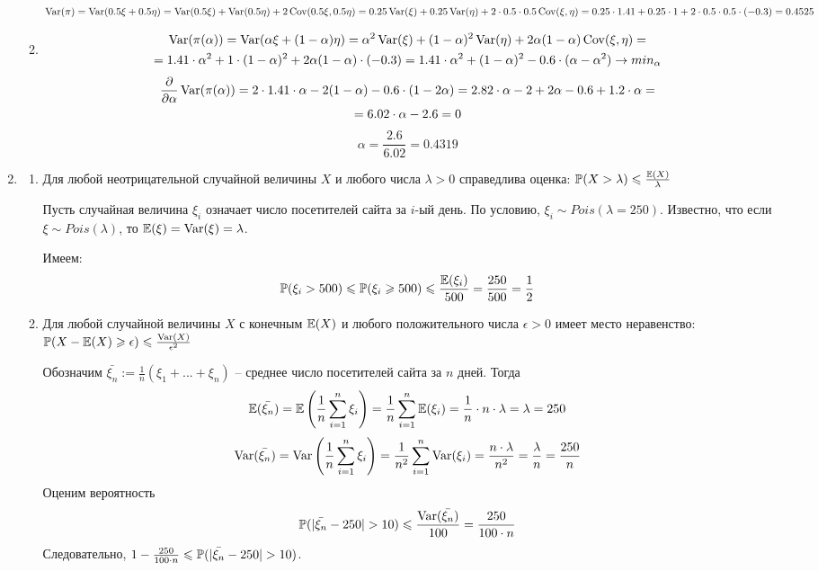 \documentclass[12pt, a4paper]{article}\usepackage[]{graphicx}\usepackage[]{color}
\begin{document}
\begin{enumerate}
\begin{enumerate}
								$\Var(\pi) = \Var(0.5 \xi + 0.5 \eta) = \Var(0.5 \xi) + \Var(0.5\eta) + 2 \Cov (0.5\xi, 0.5\eta) = 0.25\Var(\xi) + 0.25\Var(\eta) + 2 \cdot 0.5 \cdot 0.5 \Cov(\xi, \eta) = 0.25 \cdot 1.41 + 0.25 \cdot 1 + 2 \cdot 0.5 \cdot 0.5 \cdot (-0.3) = 0.4525$
								\item
								\begin{multline*}
								\Var(\pi(\alpha)) = \Var(\alpha \xi + (1-\alpha)\eta) = \alpha^2\Var(\xi) + (1-\alpha)^2 \Var(\eta) + 2\alpha(1-\alpha) \Cov(\xi, \eta) = \\
								= 1.41 \cdot \alpha^2 + 1\cdot (1-\alpha)^2 + 2\alpha(1-\alpha) \cdot (-0.3) = 1.41 \cdot \alpha^2 + (1-\alpha)^2 - 0.6 \cdot (\alpha - \alpha^2) \to min_\alpha
								\end{multline*}
								\begin{multline*}
								\frac{\partial}{\partial \alpha} \Var(\pi(\alpha)) = 2 \cdot 1.41 \cdot \alpha -2(1-\alpha) -0.6\cdot(1-2\alpha) = 2.82 \cdot \alpha - 2 + 2\alpha - 0.6 + 1.2 \cdot \alpha = \\
								= 6.02 \cdot \alpha - 2.6 = 0
								\end{multline*}
								\[
								\alpha = \frac{2.6}{6.02} = 0.4319
								\]
							\end{enumerate}
							\item \begin{enumerate}
								\item Для любой неотрицательной случайной величины $X$ и любого числа $\lambda > 0$ справедлива оценка: $\P(X>\lambda) \leq \frac{\E(X)}{\lambda}$

								Пусть случайная величина $\xi_i$ означает число посетителей сайта за $i$-ый день. По условию, $\xi_i \sim Pois(\lambda=250)$. Известно, что если $\xi \sim Pois(\lambda)$, то $\E(\xi) = \Var(\xi) = \lambda$.

								Имеем:
								\[
								\P(\xi_i >500) \leq \P(\xi_i \geq 500) \leq \frac{\E(\xi_i)}{500} = \frac{250}{500} = \frac{1}{2}
								\]
								\item Для любой случайной величины $X$ с конечным $\E(X)$ и любого положительного числа $\epsilon > 0$ имеет место неравенство: $\P(X-\E(X)\geq\epsilon)\leq\frac{\Var(X)}{\epsilon^2}$

								Обозначим $\bar{\xi_n} := \frac{1}{n} \left(\xi_1 + ... + \xi_n\right)$ – среднее число посетителей сайта за $n$ дней. Тогда
								\[
								\E(\bar{\xi_n}) = \E\left(\frac{1}{n} \sum_{i=1}^{n} \xi_i\right) = \frac{1}{n} \sum_{i=1}^{n} \E(\xi_i) = \frac{1}{n} \cdot n \cdot \lambda = \lambda = 250
								\]
								\[
								\Var(\bar{\xi_n}) = \Var\left(\frac{1}{n} \sum_{i=1}^{n} \xi_i\right) = \frac{1}{n^2} \sum_{i=1}^{n} \Var (\xi_i) = \frac{n \cdot \lambda}{n^2} = \frac{\lambda}{n} = \frac{250}{n}
								\]
								Оценим вероятность 
								\[
								\P(\vert\bar{\xi_n}-250\vert > 10) \leq \frac{\Var(\bar{\xi_n})}{100} = \frac{250}{100\cdot n} 
								\]
								Следовательно, $1 - \frac{250}{100\cdot n} \leq \P(\vert\bar{\xi_n}-250\vert > 10)$.
								

\end{enumerate}
\end{enumerate}
\end{document}
